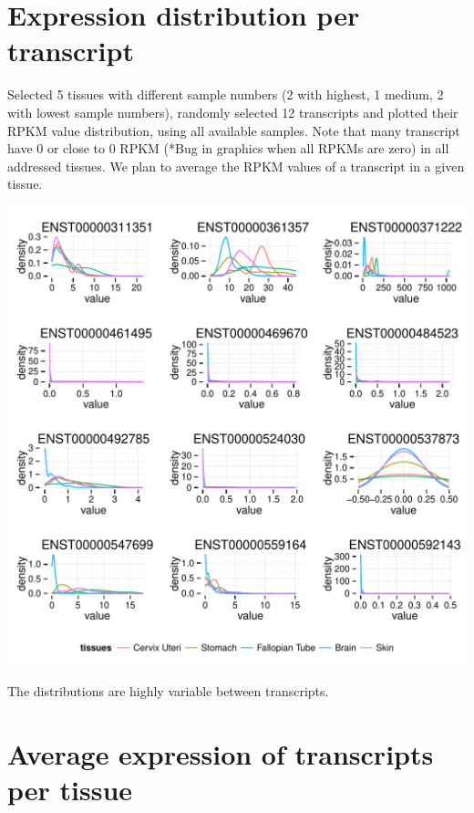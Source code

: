 \documentclass{article}\usepackage[]{graphicx}\usepackage[]{color}
\makeatletter
\def\maxwidth{ %
  \ifdim\Gin@nat@width>\linewidth
    \linewidth
  \else
    \Gin@nat@width
  \fi
}
\newenvironment{knitrout}{}{} %
\makeatother
\begin{document}
\newpage

\section{Expression distribution per transcript}

Selected 5 tissues with different sample numbers (2 with highest, 1 medium, 2 with lowest sample numbers), randomly selected 12 transcripts and plotted their RPKM value distribution, using all available samples. Note that many transcript have 0 or close to 0 RPKM (*Bug in graphics when all RPKMs are zero) in all addressed tissues. We plan to average the RPKM values of a transcript in a given tissue.

\begin{knitrout}
\color{fgcolor}
\includegraphics[width=\maxwidth]{figure/density_plot_example_transcripts-1} 

\end{knitrout}

The distributions are highly variable between transcripts. 

\section{Average expression of transcripts per tissue}
\end{document}

